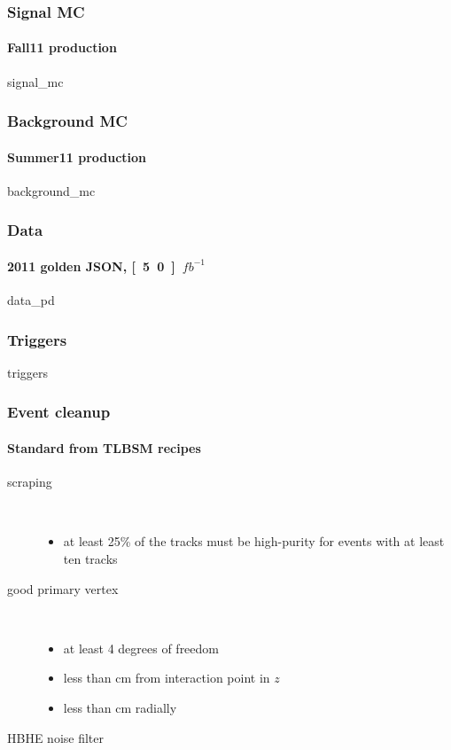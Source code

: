 \documentclass[ukenglish]{beamer}
\begin{document}
\begin{frame}
    \frametitle{Signal MC}
    \framesubtitle{Fall11 production}
    {signal_mc}
\end{frame}

\begin{frame}
    \frametitle{Background MC}
    \framesubtitle{Summer11 production}
    {background_mc}
\end{frame}

\begin{frame}
    \frametitle{Data}
    \framesubtitle{2011 golden JSON, \unit[5.0]{$fb^{-1}$}}
    {data_pd}
\end{frame}

\begin{frame}
    \frametitle{Triggers}
    {triggers}
\end{frame}

\begin{frame}
    \frametitle{Event cleanup}
    \framesubtitle{Standard from TLBSM recipes}
    \begin{description}
        \item[scraping]\hspace*{\fill}\\
            \begin{itemize}
                \item at least 25\% of the tracks must be high-purity for events
            with at least ten tracks
            \end{itemize}
        \item[good primary vertex] \hspace*{\fill}\\
            \begin{itemize}
                \item at least 4 degrees of freedom
                \item less than \unit[25]{cm} from interaction point in $z$
                \item less than \unit[2]{cm} radially
            \end{itemize}
        \item[HBHE noise filter] 
    \end{description}
\end{frame}
\end{document}
